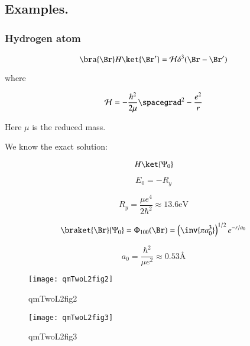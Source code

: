 \subsection{Examples.}

\subsubsection{Hydrogen atom}

\begin{equation}\label{eqn:qmTwoL2:210}
\bra{\Br} H \ket{\Br'} = \mathcal{H} \delta^3(\Br - \Br')
\end{equation}

where

\begin{equation}\label{eqn:qmTwoL2:230}
\mathcal{H} = -\frac{\hbar^2}{2 \mu} \spacegrad^2 - \frac{e^2}{r}
\end{equation}

Here $\mu$ is the reduced mass.

We know the exact solution:

\begin{equation}\label{eqn:qmTwoL2:250}
H \ket{\Psi_0}
\end{equation}

\begin{equation}\label{eqn:qmTwoL2:270}
E_0 = -R_y
\end{equation}

\begin{equation}\label{eqn:qmTwoL2:290}
R_y = \frac{\mu e^4}{2 \hbar^2} \approx 13.6 \text{eV}
\end{equation}

\begin{equation}\label{eqn:qmTwoL2:310}
\braket{\Br}{\Psi_0} = \Phi_{100}(\Br) = \left( \inv{\pi a_0^3}\right)^{1/2} e^{-r/a_0}
\end{equation}

\begin{equation}\label{eqn:qmTwoL2:330}
a_0 = \frac{\hbar^2}{\mu e^2} \approx 0.53 \text{\AA}
\end{equation}

\begin{figure}[htp]
\centering
\texttt{[image: qmTwoL2fig2]}
\caption{qmTwoL2fig2}\label{fig:qmTwoL2fig2}
\end{figure}

\begin{figure}[htp]
\centering
\texttt{[image: qmTwoL2fig3]}
\caption{qmTwoL2fig3}\label{fig:qmTwoL2fig3}
\end{figure}

